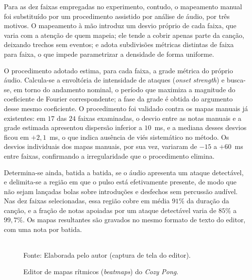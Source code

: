 Para as dez faixas empregadas no experimento, contudo, o mapeamento manual foi substituído por um procedimento assistido por análise de áudio, por três motivos. O mapeamento à mão introduz um desvio próprio de cada faixa, que varia com a atenção de quem mapeia; ele tende a cobrir apenas parte da canção, deixando trechos sem eventos; e adota subdivisões métricas distintas de faixa para faixa, o que impede parametrizar a densidade de forma uniforme.

O procedimento adotado estima, para cada faixa, a grade métrica do próprio áudio. Calcula-se a envoltória de intensidade de ataques (\textit{onset strength}) e busca-se, em torno do andamento nominal, o período que maximiza a magnitude do coeficiente de Fourier correspondente; a fase da grade é obtida do argumento desse mesmo coeficiente. O procedimento foi validado contra os mapas manuais já existentes: em $17$ das $24$ faixas examinadas, o desvio entre as notas manuais e a grade estimada apresentou dispersão inferior a $10$~ms, e a mediana desses desvios ficou em $+2{,}1$~ms, o que indica ausência de viés sistemático no método. Os desvios individuais dos mapas manuais, por sua vez, variaram de $-15$ a $+60$~ms entre faixas, confirmando a irregularidade que o procedimento elimina.

Determina-se ainda, batida a batida, se o áudio apresenta um ataque detectável, e delimita-se a região em que o pulso está efetivamente presente, de modo que não sejam lançadas bolas sobre introduções e desfechos sem percussão audível. Nas dez faixas selecionadas, essa região cobre em média $91\%$ da duração da canção, e a fração de notas apoiadas por um ataque detectável varia de $85\%$ a $99{,}7\%$. Os mapas resultantes são gravados no mesmo formato de texto do editor, com uma nota por batida.

\begin{figure}[H]
    \centering
    \caption{Editor de mapas rítmicos (\textit{beatmaps}) do \textit{Cozy Pong}. }
    \label{fig:editor}
    \\[2pt]
    {\footnotesize Fonte: Elaborada pelo autor (captura de tela do editor).}
\end{figure}


